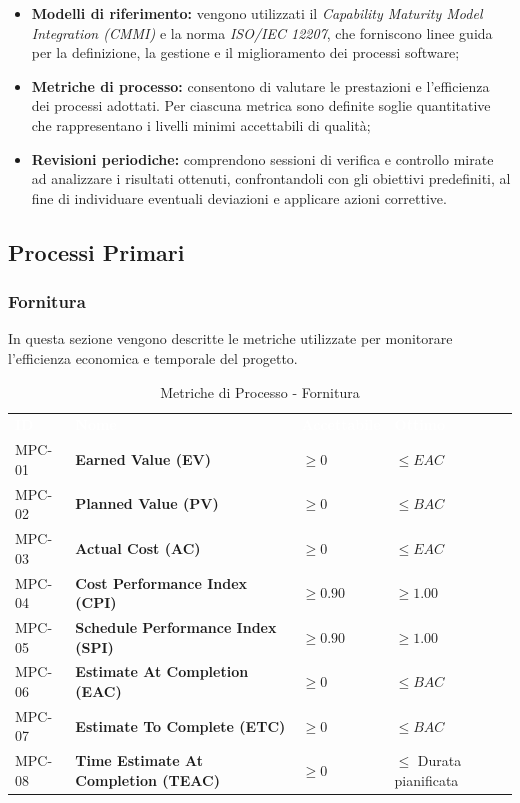 \documentclass[a4paper, 11pt]{article}
\begin{document}
\begin{itemize}
    \item \textbf{Modelli di riferimento:} vengono utilizzati il \textit{Capability Maturity Model Integration (CMMI)} e la norma \textit{ISO/IEC 12207}, che forniscono linee guida per la definizione, la gestione e il miglioramento dei processi software;
    \item \textbf{Metriche di processo:} consentono di valutare le prestazioni e l’efficienza dei processi adottati. Per ciascuna metrica sono definite soglie quantitative che rappresentano i livelli minimi accettabili di qualità;
    \item \textbf{Revisioni periodiche:} comprendono sessioni di verifica e controllo mirate ad analizzare i risultati ottenuti, confrontandoli con gli obiettivi predefiniti, al fine di individuare eventuali deviazioni e applicare azioni correttive.
\end{itemize}

\subsection{Processi Primari}

\subsubsection{Fornitura}
In questa sezione vengono descritte le metriche utilizzate per monitorare l'efficienza economica e temporale del progetto.
\begin{table}[h!]
    \centering
    \begin{tabular}{>{\centering\arraybackslash}m{1.5cm} p{6cm} >{\centering\arraybackslash}m{3cm} >{\centering\arraybackslash}m{2.5cm}}
        \rowcolor{AccentColor}
        \textcolor{white}{\textbf{ID}} & \textcolor{white}{\textbf{Nome}} & \textcolor{white}{\textbf{Accettabile}} & \textcolor{white}{\textbf{Ottimo}} \\

        MPC-01 & \textbf{Earned Value (EV)} & $\geq 0$ & $\leq EAC$ \\
        MPC-02 & \textbf{Planned Value (PV)} & $\geq 0$ & $\leq BAC$ \\
        MPC-03 & \textbf{Actual Cost (AC)} & $\geq 0$ & $\leq EAC$ \\
        MPC-04 & \textbf{Cost Performance Index (CPI)} & $\geq 0.90$ & $\geq 1.00$ \\
        MPC-05 & \textbf{Schedule Performance Index (SPI)} & $\geq 0.90$ & $\geq 1.00$ \\
        MPC-06 & \textbf{Estimate At Completion (EAC)} & $\geq 0$ & $\leq BAC$ \\
        MPC-07 & \textbf{Estimate To Complete (ETC)} & $\geq 0$ & $\leq BAC$ \\
        MPC-08 & \textbf{Time Estimate At Completion (TEAC)} & $\geq 0$ & \parbox[c]{2.5cm}{\centering $\leq$ Durata pianificata} \\

    \end{tabular}
    \caption{Metriche di Processo - Fornitura}
\end{table}
\end{document}
